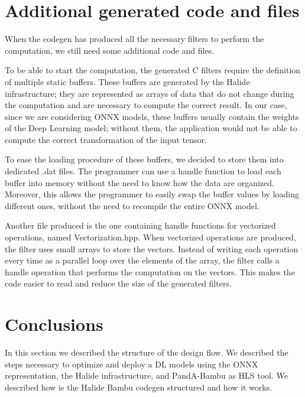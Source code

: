 \documentclass[../main.tex]{subfiles}
\begin{document}
\newpage
\section{Additional generated code and files}

When the codegen has produced all the necessary filters to perform the computation, we still need some additional code and files.

To be able to start the computation, the generated C filters require the definition of multiple static buffers.
These buffers are generated by the Halide infrastructure; they are represented as arrays of data that do not change during the computation and are necessary to compute the correct result.
In our case, since we are considering ONNX models, these buffers usually contain the weights of the Deep Learning model; without them, the application would not be able to compute the correct transformation of the input tensor.

To ease the loading procedure of these buffers, we decided to store them into dedicated .dat files.
The programmer can use a handle function to load each buffer into memory without the need to know how the data are organized.
Moreover, this allows the programmer to easily swap the buffer values by loading different ones, without the need to recompile the entire ONNX model.

Another file produced is the one containing handle functions for vectorized operations, named Vectorization.hpp.
When vectorized operations are produced, the filter uses small arrays to store the vectors.
Instead of writing each operation every time as a parallel loop over the elements of the array, the filter calls a handle operation that performs the computation on the vectors.
This makes the code easier to read and reduce the size of the generated filters.

\section{Conclusions}
In this section we described the structure of the design flow. We described the steps necessary to optimize and deploy a DL models using the ONNX representation, the Halide infrastructure, and PandA-Bambu as HLS tool. We described how is the Halide Bambu codegen structured and how it works.
\end{document}
